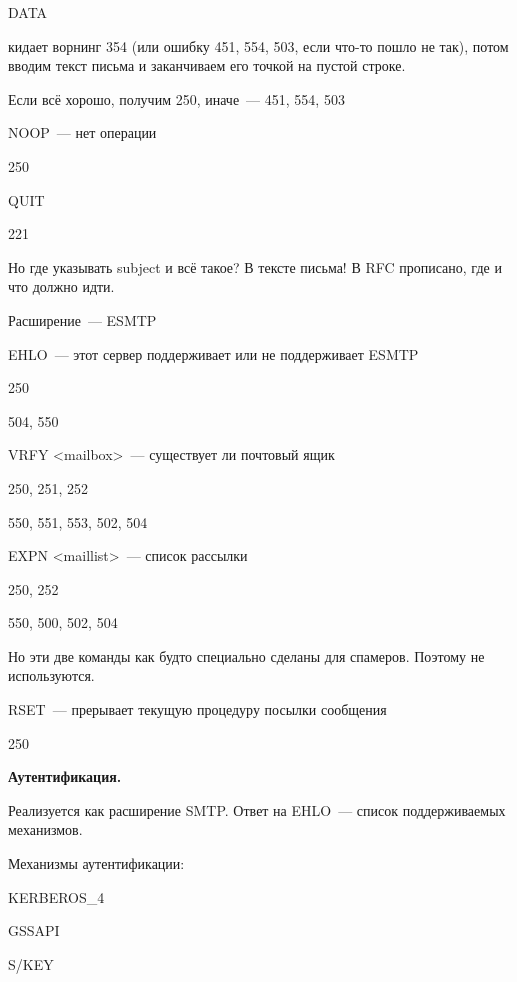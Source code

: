 DATA

кидает ворнинг 354 (или ошибку 451, 554, 503, если что-то пошло не так), потом вводим текст письма и заканчиваем его точкой на пустой строке.

Если всё хорошо, получим 250, иначе~--- 451, 554, 503

NOOP~--- нет операции
\begin{MyItemize}
    \item 250
\end{MyItemize}

QUIT
\begin{MyItemize}
    \item 221
\end{MyItemize}

Но где указывать subject и всё такое? В тексте письма! В RFC прописано, где и что должно идти.

Расширение~--- ESMTP

EHLO~--- этот сервер поддерживает или не поддерживает ESMTP
\begin{MyItemize}
    \item 250
    \item 504, 550
\end{MyItemize}

VRFY <mailbox>~--- существует ли почтовый ящик
\begin{MyItemize}
    \item 250, 251, 252
    \item 550, 551, 553, 502, 504
\end{MyItemize}

EXPN <maillist>~--- список рассылки
\begin{MyItemize}
    \item 250, 252
    \item 550, 500, 502, 504
\end{MyItemize}

Но эти две команды как будто специально сделаны для спамеров. Поэтому не используются.

RSET~--- прерывает текущую процедуру посылки сообщения
\begin{MyItemize}
    \item 250
\end{MyItemize}

{\bf Аутентификация.}

Реализуется как расширение SMTP. Ответ на EHLO~--- список поддерживаемых механизмов.

Механизмы аутентификации:
\begin{MyItemize}
    \item KERBEROS\_4
    \item GSSAPI
    \item S/KEY
\end{MyItemize}


